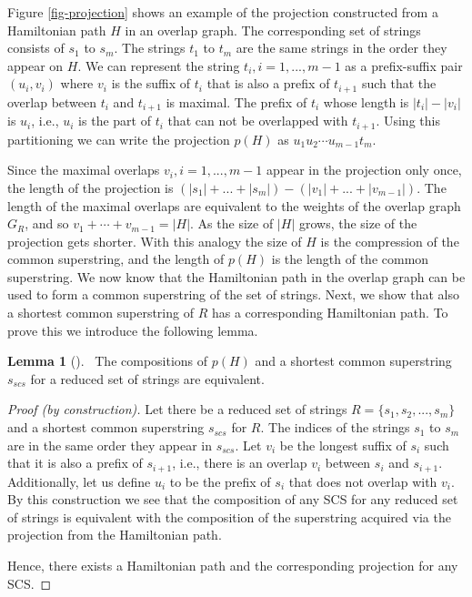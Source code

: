 \documentclass[english,twoside,censored,csm,algorithms-track-2020]{HYthesisML}
\theoremstyle{plain}
\theoremstyle{definition}
\newtheorem{lemma}[theorem]{Lemma}
\begin{document}

Figure \ref{fig-projection} shows an example of the projection constructed from a
Hamiltonian path $H$ in an overlap graph. The corresponding set of
strings consists of $s_1$ to $s_m$.
The strings $t_1$ to $t_m$ are the same strings in the order they appear on $H$.
We can represent the string $t_i, i=1,...,m-1$ as a prefix-suffix pair
$(u_i,v_i)$ where $v_i$ is the suffix of $t_i$ that is also a prefix of $t_{i+1}$ such that the
overlap between $t_i$ and $t_{i+1}$ is maximal. The prefix of $t_i$ whose length is $|t_i|-|v_i|$ is
$u_i$, i.e., $u_i$ is the part of $t_i$ that can not be overlapped with $t_{i+1}$. Using this
partitioning we can write the projection $p(H)$ as $u_1u_2\cdots u_{m-1}t_m$.

Since the maximal overlaps $v_i,i=1,...,m-1$ appear in the projection only once, the length of the
projection is $(|s_1|+...+|s_m|) - (|v_1|+...+|v_{m-1}|)$. The length of the maximal overlaps
are equivalent to the weights of the overlap graph $G_R$, and so $v_1+\cdots +v_{m-1} = |H|$. As the size
of $|H|$ grows, the size of the projection gets shorter.
With this analogy the size of $H$ is the compression of the common superstring,
and the length of $p(H)$ is the length of the common superstring.
We now know that the Hamiltonian path in the overlap graph can be used to form a common superstring
of the set of strings. Next, we show that also a shortest common superstring of $R$ has a
corresponding Hamiltonian path. To prove this we introduce the following lemma.


\begin{lemma}[]~\label{lem-composition}
The compositions of $p(H)$ and a shortest common superstring $s_{scs}$ for a reduced set of strings are equivalent.
\end{lemma}
\begin{proof}[Proof (by construction)]
  Let there be a reduced set of strings $R=\{s_1,s_2,...,s_m\}$ and
  a shortest common superstring $s_{scs}$ for $R$. The indices of the strings $s_1$ to $s_m$ are in the same
  order they appear in $s_{scs}$. Let $v_i$ be the longest suffix of $s_i$ such that it is also a prefix
  of $s_{i+1}$, i.e., there is an overlap $v_i$ between $s_i$ and $s_{i+1}$. Additionally, let us
  define $u_i$ to be the prefix of $s_i$ that does not overlap with $v_i$. By this construction we
  see that the composition of any SCS for any reduced set of strings is equivalent with the composition
  of the superstring acquired via the projection from the Hamiltonian path.

  Hence, there exists a Hamiltonian path and the corresponding projection for any SCS.

\end{proof}
\end{document}
